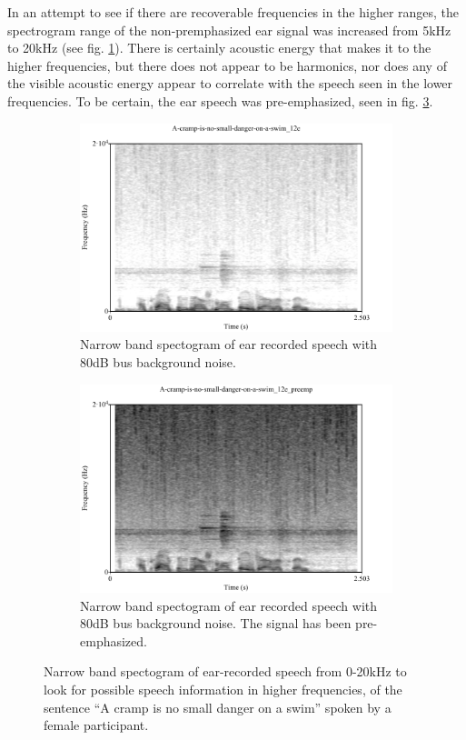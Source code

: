\documentclass[dissertation,copyright]{uathesis}
\begin{document}
In an attempt to see if there are recoverable frequencies in the higher ranges, the spectrogram range of the non-premphasized ear signal was increased from 5kHz to 20kHz (see fig. \ref{spctgrmEarNarrow20kHz}). There is certainly acoustic energy that makes it to the higher frequencies, but there does not appear to be harmonics, nor does any of the visible acoustic energy appear to correlate with the speech seen in the lower frequencies.
To be certain, the ear speech was pre-emphasized, seen in fig. \ref{spctgrmNarrowEarNoisePremp_35}.    
\begin{figure}
\centering
\begin{subfigure}{0.475\textwidth}
  \centering
  \includegraphics[width=1\linewidth]{figure/spctgrmEarNarrow20kHz.pdf}
  \caption{Narrow band spectogram of ear recorded speech with 80dB bus background noise.}
  \label{spctgrmEarNarrow20kHz}
\end{subfigure}%
\hfill
\begin{subfigure}{0.475\textwidth}
  \centering
  \includegraphics[width=1\linewidth]{figure/spctgrmNarrowEarNoisePremp.pdf}
  \caption{Narrow band spectogram of ear recorded speech with 80dB bus background noise.  The signal has been pre-emphasized.}
  \label{spctgrmNarrowEarNoisePremp_35}
\end{subfigure}
\caption{Narrow band spectogram of ear-recorded speech from 0-20kHz to look for possible speech information in higher frequencies, of the sentence ``A cramp is no small danger on a swim'' spoken by a female participant.}
\end{figure}
\end{document}
